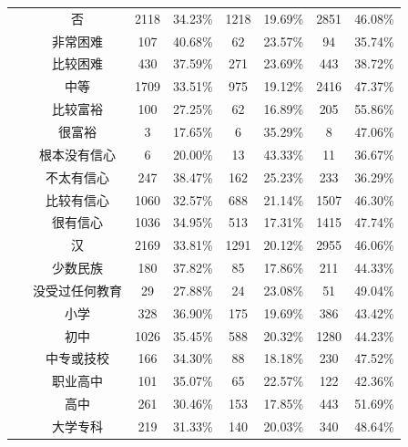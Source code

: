 \documentclass[zihao = -4, linespread = 1.5]{article}
\begin{document}
\begin{table}[!t]
\begin{threeparttable}
{\begin{tabular}{cccccccc}
                ~ & 否 & 2118 & 34.23\% & 1218 & 19.69\% & 2851 & 46.08\% \\
                \addlinespace
                \multirow{5}{*}{家庭经济} & 非常困难 & 107 & 40.68\% & 62 & 23.57\% & 94 & 35.74\% \\
                ~ & 比较困难 & 430 & 37.59\% & 271 & 23.69\% & 443 & 38.72\% \\
                ~ & 中等 & 1709 & 33.51\% & 975 & 19.12\% & 2416 & 47.37\% \\
                ~ & 比较富裕 & 100 & 27.25\% & 62 & 16.89\% & 205 & 55.86\% \\
                ~ & 很富裕 & 3 & 17.65\% & 6 & 35.29\% & 8 & 47.06\% \\
                \addlinespace
                \multirow{4}{*}{对孩子} & 根本没有信心 & 6 & 20.00\% & 13 & 43.33\% & 11 & 36.67\% \\
                ~ & 不太有信心 & 247 & 38.47\% & 162 & 25.23\% & 233 & 36.29\% \\
                ~ & 比较有信心 & 1060 & 32.57\% & 688 & 21.14\% & 1507 & 46.30\% \\
                ~ & 很有信心 & 1036 & 34.95\% & 513 & 17.31\% & 1415 & 47.74\% \\
                \addlinespace
                \multirow{2}{*}{民族} & 汉 & 2169 & 33.81\% & 1291 & 20.12\% & 2955 & 46.06\% \\
                ~ & \cellcolor{MorandiBlue!20}少数民族 & \cellcolor{MorandiBlue!20}180 & \cellcolor{MorandiBlue!20}37.82\% & \cellcolor{MorandiBlue!20}85 & \cellcolor{MorandiBlue!20}17.86\% & \cellcolor{MorandiBlue!20}211 & \cellcolor{MorandiBlue!20}44.33\% \\
                \addlinespace
                \multirow{9}{*}{学历} & 没受过任何教育 & 29 & 27.88\% & 24 & 23.08\% & 51 & 49.04\% \\
                ~ & 小学 & 328 & 36.90\% & 175 & 19.69\% & 386 & 43.42\% \\
                ~ & 初中 & 1026 & 35.45\% & 588 & 20.32\% & 1280 & 44.23\% \\
                ~ & 中专或技校 & 166 & 34.30\% & 88 & 18.18\% & 230 & 47.52\% \\
                ~ & 职业高中 & 101 & 35.07\% & 65 & 22.57\% & 122 & 42.36\% \\
                ~ & 高中 & 261 & 30.46\% & 153 & 17.85\% & 443 & 51.69\% \\
                ~ & 大学专科 & 219 & 31.33\% & 140 & 20.03\% & 340 & 48.64\% \\

\end{tabular}}
\end{threeparttable}
\end{table}
\end{document}
